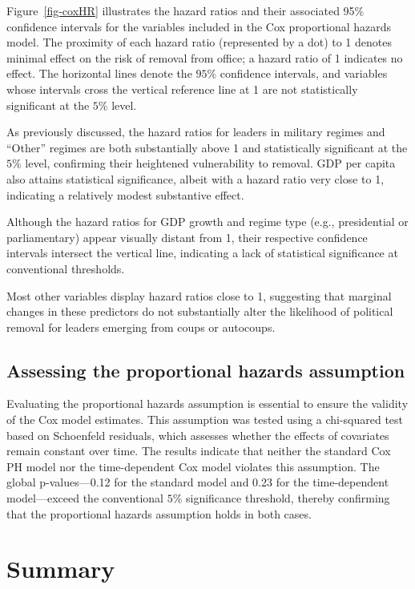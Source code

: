 \documentclass[
  12pt,
]{report}
\begin{document}
Figure~\ref{fig-coxHR} illustrates the hazard ratios and their
associated 95\% confidence intervals for the variables included in the
Cox proportional hazards model. The proximity of each hazard ratio
(represented by a dot) to 1 denotes minimal effect on the risk of
removal from office; a hazard ratio of 1 indicates no effect. The
horizontal lines denote the \(95\%\) confidence intervals, and variables
whose intervals cross the vertical reference line at 1 are not
statistically significant at the \(5\%\) level.

As previously discussed, the hazard ratios for leaders in military
regimes and ``Other'' regimes are both substantially above 1 and
statistically significant at the \(5\%\) level, confirming their
heightened vulnerability to removal. GDP per capita also attains
statistical significance, albeit with a hazard ratio very close to 1,
indicating a relatively modest substantive effect.

Although the hazard ratios for GDP growth and regime type (e.g.,
presidential or parliamentary) appear visually distant from 1, their
respective confidence intervals intersect the vertical line, indicating
a lack of statistical significance at conventional thresholds.

Most other variables display hazard ratios close to 1, suggesting that
marginal changes in these predictors do not substantially alter the
likelihood of political removal for leaders emerging from coups or
autocoups.

\subsection{Assessing the proportional hazards
assumption}\label{assessing-the-proportional-hazards-assumption}

Evaluating the proportional hazards assumption is essential to ensure
the validity of the Cox model estimates. This assumption was tested
using a chi-squared test based on Schoenfeld residuals, which assesses
whether the effects of covariates remain constant over time. The results
indicate that neither the standard Cox PH model nor the time-dependent
Cox model violates this assumption. The global p-values---0.12 for the
standard model and 0.23 for the time-dependent model---exceed the
conventional \(5\%\) significance threshold, thereby confirming that the
proportional hazards assumption holds in both cases.

\section{Summary}\label{summary-2}
\end{document}
